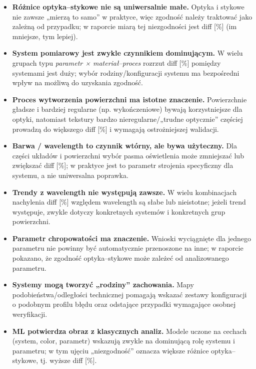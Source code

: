 \documentclass[
  10pt,
]{article}
\providecommand{\tightlist}{%
  \setlength{\itemsep}{0pt}\setlength{\parskip}{0pt}}
\begin{document}
\begin{itemize}
\tightlist
\item
  \textbf{Różnice optyka--stykowe nie są uniwersalnie małe.} Optyka i
  stykowe nie zawsze „mierzą to samo'' w praktyce, więc zgodność należy
  traktować jako zależną od przypadku; w raporcie miarą tej niezgodności
  jest \textbar diff\textbar{} {[}\%{]} (im mniejsze, tym lepiej).
\item
  \textbf{System pomiarowy jest zwykle czynnikiem dominującym.} W wielu
  grupach typu \emph{parametr × materiał--proces} rozrzut
  \textbar diff\textbar{} {[}\%{]} pomiędzy systemami jest duży; wybór
  rodziny/konfiguracji systemu ma bezpośredni wpływ na możliwą do
  uzyskania zgodność.
\item
  \textbf{Proces wytworzenia powierzchni ma istotne znaczenie.}
  Powierzchnie gładsze i bardziej regularne (np. wykończeniowe) bywają
  korzystniejsze dla optyki, natomiast tekstury bardzo
  nieregularne/„trudne optycznie'' częściej prowadzą do większego
  \textbar diff\textbar{} {[}\%{]} i wymagają ostrożniejszej walidacji.
\item
  \textbf{Barwa / wavelength to czynnik wtórny, ale bywa użyteczny.} Dla
  części układów i powierzchni wybór pasma oświetlenia może zmniejszać
  lub zwiększać \textbar diff\textbar{} {[}\%{]}; w praktyce jest to
  parametr strojenia specyficzny dla systemu, a nie uniwersalna
  poprawka.
\item
  \textbf{Trendy z wavelength nie występują zawsze.} W wielu
  kombinacjach nachylenia \textbar diff\textbar{} {[}\%{]} względem
  wavelength są słabe lub nieistotne; jeżeli trend występuje, zwykle
  dotyczy konkretnych systemów i konkretnych grup powierzchni.
\item
  \textbf{Parametr chropowatości ma znaczenie.} Wnioski wyciągnięte dla
  jednego parametru nie powinny być automatycznie przenoszone na inne; w
  raporcie pokazano, że zgodność optyka--stykowe może zależeć od
  analizowanego parametru.
\item
  \textbf{Systemy mogą tworzyć „rodziny'' zachowania.} Mapy
  podobieństwa/odległości technicznej pomagają wskazać zestawy
  konfiguracji o podobnym profilu błędu oraz odstające przypadki
  wymagające osobnej weryfikacji.
\item
  \textbf{ML potwierdza obraz z klasycznych analiz.} Modele uczone na
  cechach (system, color, parametr) wskazują zwykle na dominującą rolę
  systemu i parametru; w tym ujęciu „niezgodność'' oznacza większe
  różnice optyka--stykowe, tj. wyższe \textbar diff\textbar{} {[}\%{]}.
\end{itemize}
\end{document}
